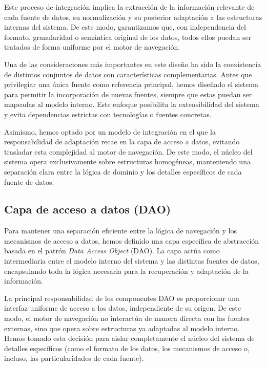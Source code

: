 Este proceso de integración implica la extracción de la información relevante de cada fuente de datos,
su normalización y su posterior adaptación a las estructuras internas del sistema. De este modo,
garantizamos que, con independencia del formato, granularidad o semántica original de los datos, todos
ellos puedan ser tratados de forma uniforme por el motor de navegación.

Una de las consideraciones más importantes en este diseño ha sido la coexistencia de distintos conjuntos de datos
con características complementarias. Antes que privilegiar una única fuente como referencia principal,
hemos diseñado el sistema para permitir la incorporación de nuevas fuentes, siempre que estas
puedan ser mapeadas al modelo interno. Este enfoque posibilita la extensibilidad del sistema y evita
dependencias estrictas con tecnologías o fuentes concretas.

Asimismo, hemos optado por un modelo de integración en el que la responsabilidad de adaptación recae en
la capa de acceso a datos, evitando trasladar esta complejidad al motor de navegación. De este modo, el
núcleo del sistema opera exclusivamente sobre estructuras homogéneas, manteniendo una separación clara
entre la lógica de dominio y los detalles específicos de cada fuente de datos.

    \subsection*{Capa de acceso a datos (DAO)}

Para mantener una separación eficiente entre la lógica de navegación y los mecanismos de acceso
a datos, hemos definido una capa específica de abstracción basada en el patrón \textit{Data Access Object} (DAO).
La capa actúa como intermediaria entre el modelo interno del sistema y las distintas fuentes de datos,
encapsulando toda la lógica necesaria para la recuperación y adaptación de la información.

La principal responsabilidad de los componentes DAO es proporcionar una interfaz uniforme de acceso a los datos,
independiente de su origen. De este modo, el motor de navegación no interactúa de manera directa con las fuentes externas,
sino que opera sobre estructuras ya adaptadas al modelo interno. Hemos tomado esta decisión para aislar completamente el núcleo
del sistema de detalles específicos (como el formato de los datos, los mecanismos de acceso o, incluso, las 
particularidades de cada fuente).

